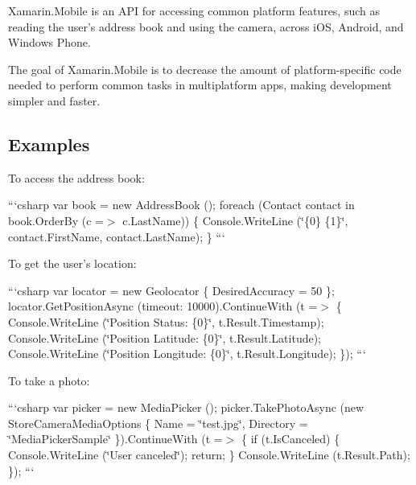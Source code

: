 Xamarin.\+Mobile is an A\+P\+I for accessing common platform features, such as reading the user's address book and using the camera, across i\+O\+S, Android, and Windows Phone.

The goal of Xamarin.\+Mobile is to decrease the amount of platform-\/specific code needed to perform common tasks in multiplatform apps, making development simpler and faster.

\subsection*{Examples}

To access the address book\+:

```csharp var book = new Address\+Book (); foreach (Contact contact in book.\+Order\+By (c =$>$ c.\+Last\+Name)) \{ Console.\+Write\+Line (\char`\"{}\{0\} \{1\}\char`\"{}, contact.\+First\+Name, contact.\+Last\+Name); \} ```

To get the user's location\+:

```csharp var locator = new Geolocator \{ Desired\+Accuracy = 50 \}; locator.\+Get\+Position\+Async (timeout\+: 10000).Continue\+With (t =$>$ \{ Console.\+Write\+Line (\char`\"{}\+Position Status\+: \{0\}\char`\"{}, t.\+Result.\+Timestamp); Console.\+Write\+Line (\char`\"{}\+Position Latitude\+: \{0\}\char`\"{}, t.\+Result.\+Latitude); Console.\+Write\+Line (\char`\"{}\+Position Longitude\+: \{0\}\char`\"{}, t.\+Result.\+Longitude); \}); ```

To take a photo\+:

```csharp var picker = new Media\+Picker (); picker.\+Take\+Photo\+Async (new Store\+Camera\+Media\+Options \{ Name = \char`\"{}test.\+jpg\char`\"{}, Directory = \char`\"{}\+Media\+Picker\+Sample\char`\"{} \}).Continue\+With (t =$>$ \{ if (t.\+Is\+Canceled) \{ Console.\+Write\+Line (\char`\"{}\+User canceled\char`\"{}); return; \} Console.\+Write\+Line (t.\+Result.\+Path); \}); ``` 